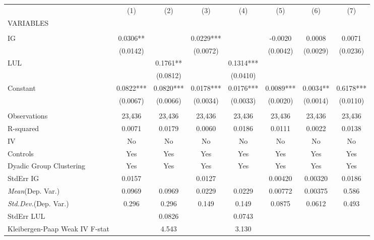 \documentclass[]{article}
\begin{document}
\begin{tabular}{lccccccc} \hline
 & (1) & (2) & (3) & (4) & (5) & (6) & (7) \\
VARIABLES &  &  &  &  &  &  &  \\ \hline
 &  &  &  &  &  &  &  \\
IG & 0.0306** &  & 0.0229*** &  & -0.0020 & 0.0008 & 0.0071 \\
 & (0.0142) &  & (0.0072) &  & (0.0042) & (0.0029) & (0.0236) \\
LUL &  & 0.1761** &  & 0.1314*** &  &  &  \\
 &  & (0.0812) &  & (0.0410) &  &  &  \\
Constant & 0.0822*** & 0.0820*** & 0.0178*** & 0.0176*** & 0.0089*** & 0.0034** & 0.6178*** \\
 & (0.0067) & (0.0066) & (0.0034) & (0.0033) & (0.0020) & (0.0014) & (0.0110) \\
 &  &  &  &  &  &  &  \\
Observations & 23,436 & 23,436 & 23,436 & 23,436 & 23,436 & 23,436 & 23,436 \\
R-squared & 0.0071 & 0.0179 & 0.0060 & 0.0186 & 0.0111 & 0.0022 & 0.0138 \\
IV & No & No & No & No & No & No & No \\
Controls & Yes & Yes & Yes & Yes & Yes & Yes & Yes \\
Dyadic Group Clustering & Yes & Yes & Yes & Yes & Yes & Yes & Yes \\
StdErr IG & 0.0157 &  & 0.0127 &  & 0.00420 & 0.00320 & 0.0186 \\
\textit{Mean}(Dep. Var.) & 0.0969 & 0.0969 & 0.0229 & 0.0229 & 0.00772 & 0.00375 & 0.586 \\
\textit{Std.Dev.}(Dep. Var.) & 0.296 & 0.296 & 0.149 & 0.149 & 0.0875 & 0.0612 & 0.493 \\
StdErr LUL &  & 0.0826 &  & 0.0743 &  &  &  \\
 Kleibergen-Paap Weak IV F-stat &  & 4.543 &  & 3.130 &  &  &  \\ \hline
\end{tabular}
\end{document}
